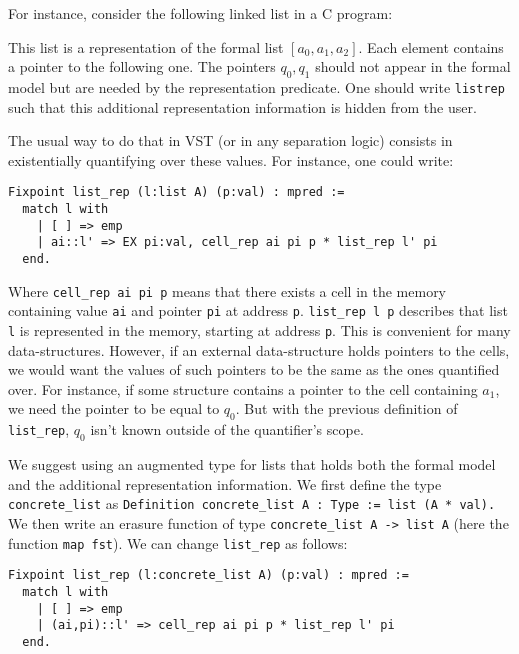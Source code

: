 For instance, consider the following linked list in a C program:

\begin{center}
\end{center}

This list is a representation of the formal list $[a_0,a_1,a_2]$.
Each element contains a pointer to the following one.
The pointers $q_0, q_1$ should not appear in the formal model but are needed by the representation predicate.
One should write \lstinline{listrep} such that this additional representation information is hidden from the user.

The usual way to do that in VST (or in any separation logic) consists in existentially quantifying over these values.
For instance, one could write:
\begin{lstlisting}[language=Coq]
Fixpoint list_rep (l:list A) (p:val) : mpred :=
  match l with
    | [ ] => emp
    | ai::l' => EX pi:val, cell_rep ai pi p * list_rep l' pi
  end.
\end{lstlisting}

Where \lstinline{cell_rep ai pi p} means that there exists a cell in the memory containing value \texttt{ai} and pointer \texttt{pi} at address \texttt{p}.
\lstinline{list_rep l p} describes that list \texttt{l} is represented in the memory, starting at address \texttt{p}. This is convenient for many data-structures.
However, if an external data-structure holds pointers to the cells, we would want the values of such pointers to be the same as the ones quantified over.
For instance, if some structure contains a pointer to the cell containing $a_1$, we need the pointer to be equal to $q_0$.
But with the previous definition of \lstinline{list_rep}, $q_0$ isn't known outside of the quantifier's scope.

We suggest using an augmented type for lists that holds both the formal model and the additional representation information.
We first define the type \lstinline{concrete_list} as
\lstinline[language=Coq]{Definition concrete_list A : Type := list (A * val).}
We then write an erasure function of type \lstinline[language=Coq]{concrete_list A -> list A} (here the function \lstinline[language=Coq]{map fst}).
We can change \lstinline[language=Coq]{list_rep} as follows:
\begin{lstlisting}[language=Coq]
Fixpoint list_rep (l:concrete_list A) (p:val) : mpred :=
  match l with
    | [ ] => emp
    | (ai,pi)::l' => cell_rep ai pi p * list_rep l' pi
  end.
\end{lstlisting}

